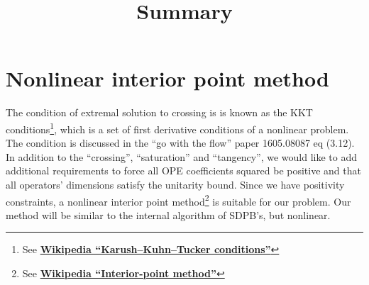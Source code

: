 \documentclass[11pt]{article}
\renewcommand{\(}{\left(}
\renewcommand{\)}{\right)}
\renewcommand{\[}{\left[}
\renewcommand{\]}{\right]}
\newcommand{\<}{\left\langle}
\renewcommand{\>}{\right\rangle}
\begin{document}
\title{Summary}
\author{}
\date{}
\maketitle

\tableofcontents

\pagebreak

\section{Nonlinear interior point method}


The condition of extremal solution to crossing is is known as the KKT conditions\footnote{See \href{https://en.wikipedia.org/wiki/Karush\%E2\%80\%93Kuhn\%E2\%80\%93Tucker_conditions}{\bf Wikipedia ``Karush–Kuhn–Tucker conditions''}}, which is a set of first derivative conditions of a nonlinear problem. The condition is discussed in the ``go with the flow'' paper 1605.08087 eq (3.12). In addition to the ``crossing'', ``saturation'' and ``tangency'', we would like to add additional requirements to force all OPE coefficients squared be positive and that all operators' dimensions satisfy the unitarity bound. Since we have positivity constraints, a nonlinear interior point method\footnote{See \href{https://en.wikipedia.org/wiki/Interior-point_method}{\bf Wikipedia ``Interior-point method''}} is suitable for our problem. Our method will be similar to the internal algorithm of SDPB's, but nonlinear. 
\end{document}
